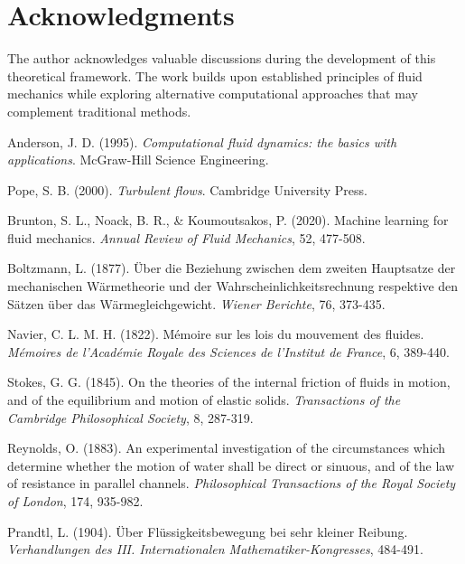 \documentclass[12pt,a4paper]{article}
\begin{document}
\section{Acknowledgments}

The author acknowledges valuable discussions during the development of this theoretical framework. The work builds upon established principles of fluid mechanics while exploring alternative computational approaches that may complement traditional methods.

\begin{thebibliography}{99}

Anderson, J. D. (1995). \textit{Computational fluid dynamics: the basics with applications}. McGraw-Hill Science Engineering.

Pope, S. B. (2000). \textit{Turbulent flows}. Cambridge University Press.

Brunton, S. L., Noack, B. R., \& Koumoutsakos, P. (2020). Machine learning for fluid mechanics. \textit{Annual Review of Fluid Mechanics}, 52, 477-508.

Boltzmann, L. (1877). Über die Beziehung zwischen dem zweiten Hauptsatze der mechanischen Wärmetheorie und der Wahrscheinlichkeitsrechnung respektive den Sätzen über das Wärmegleichgewicht. \textit{Wiener Berichte}, 76, 373-435.

Navier, C. L. M. H. (1822). Mémoire sur les lois du mouvement des fluides. \textit{Mémoires de l'Académie Royale des Sciences de l'Institut de France}, 6, 389-440.

Stokes, G. G. (1845). On the theories of the internal friction of fluids in motion, and of the equilibrium and motion of elastic solids. \textit{Transactions of the Cambridge Philosophical Society}, 8, 287-319.

Reynolds, O. (1883). An experimental investigation of the circumstances which determine whether the motion of water shall be direct or sinuous, and of the law of resistance in parallel channels. \textit{Philosophical Transactions of the Royal Society of London}, 174, 935-982.

Prandtl, L. (1904). Über Flüssigkeitsbewegung bei sehr kleiner Reibung. \textit{Verhandlungen des III. Internationalen Mathematiker-Kongresses}, 484-491.

\end{thebibliography}
\end{document}
